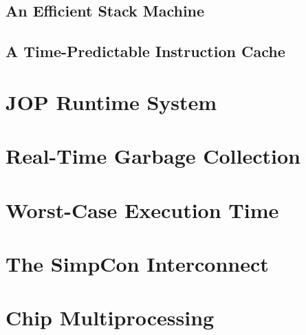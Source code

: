    
\clearpage %
    

\clearpage
    \section{An Efficient Stack Machine}
    \label{sec:stack}
    

\clearpage
    
\clearpage
    

\clearpage
    \section{A Time-Predictable Instruction Cache}
    \label{sec:cache}
    

\chapter{JOP Runtime System}
\label{chap:runtime}

    
    
    
    
\clearpage
    
    

\chapter{Real-Time Garbage Collection}
\label{chap:rtgc}
    

\chapter{Worst-Case Execution Time}
\label{chap:wcet}
    

\chapter{The SimpCon Interconnect}
\label{chap:simpcon}
\newcommand{\scgrsc}{.65}
\newcommand{\scgrp}{simpcon}



\chapter{Chip Multiprocessing}
\label{chap:cmp}



%

